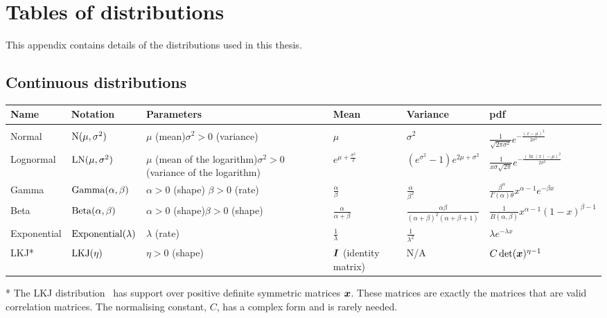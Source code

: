 \documentclass[thesis.tex]{subfiles}
\begin{document}
\chapter{Tables of distributions} \label{distributions}

This appendix contains details of the distributions used in this thesis.

\begin{landscape}
\section{Continuous distributions}
\begin{tabular}{llp{3.5cm}lll}
Name & Notation & Parameters & Mean & Variance & pdf\\
\hline \\
Normal & $\operatorname{N}(\mu, \sigma^2)$ & $\mu$ (mean)\newline $\sigma^2 > 0$ (variance) & $\mu$ & $\sigma^2$ & $\frac{1}{\sqrt{2\pi\sigma^2}}e^{-\frac{(x-\mu)^2}{2\sigma^2}}$ \\
Lognormal & $\operatorname{LN}(\mu, \sigma^2)$ & $\mu$ (mean of the logarithm)\newline $\sigma^2 > 0$ (variance of the logarithm) & $e^{\mu + \frac{\sigma^2}{2}}$ & $(e^{\sigma^2} - 1)e^{2\mu + \sigma^2}$ & $\frac{1}{x\sigma\sqrt{2\pi}}e^{-\frac{(\ln(x)-\mu)^2}{2\sigma^2}}$ \\
Gamma & $\operatorname{Gamma}(\alpha, \beta)$ & $\alpha > 0$ (shape) \newline $\beta > 0$ (rate) & $\frac{\alpha}{\beta}$ & $\frac{\alpha}{\beta^2}$ & $\frac{\beta^\alpha}{\Gamma(\alpha)\theta}x^{\alpha-1}e^{-\beta x}$ \\
Beta & $\operatorname{Beta}(\alpha, \beta)$ & $\alpha > 0$ (shape)\newline $\beta > 0$ (shape) & $\frac{\alpha}{\alpha+\beta}$ & $\frac{\alpha\beta}{(\alpha+\beta)^2(\alpha+\beta+1)}$ & $\frac{1}{B(\alpha,\beta)}x^{\alpha-1}(1-x)^{\beta-1}$ \\
Exponential & $\operatorname{Exponential}(\lambda)$ & $\lambda$ (rate) & $\frac{1}{\lambda}$ & $\frac{1}{\lambda^2}$ & $\lambda e^{-\lambda x}$ \\
LKJ* & $\operatorname{LKJ}(\eta)$ & $\eta > 0$ (shape) & $\bm{I}$ (identity matrix) & N/A & $C \det(\bm{x})^{\eta-1}$ \\
\end{tabular}

* The LKJ distribution~\autocite{lewandowskiGenerating} has support over positive definite symmetric matrices $\bm{x}$.
These matrices are exactly the matrices that are valid correlation matrices.
The normalising constant, $C$, has a complex form and is rarely needed.


\end{landscape}
\end{document}
